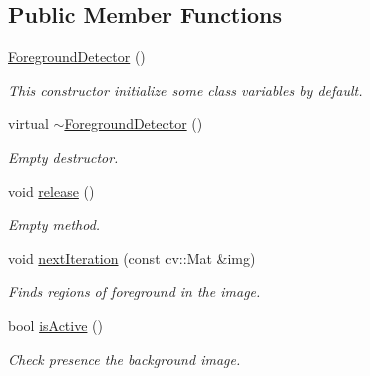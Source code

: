 \subsection*{Public Member Functions}
\begin{DoxyCompactItemize}
\item 
\hyperlink{classtld_1_1ForegroundDetector_afb086f8195e7358d8afb7c24194fc131}{Foreground\-Detector} ()
\begin{DoxyCompactList}\small\item\em This constructor initialize some class variables by default. \end{DoxyCompactList}\item 
virtual \hyperlink{classtld_1_1ForegroundDetector_ade0fb08c42a39ce8a2482b2bacea8c02}{$\sim$\-Foreground\-Detector} ()
\begin{DoxyCompactList}\small\item\em Empty destructor. \end{DoxyCompactList}\item 
void \hyperlink{classtld_1_1ForegroundDetector_a0bf609b2ba46774804a929253c225aac}{release} ()
\begin{DoxyCompactList}\small\item\em Empty method. \end{DoxyCompactList}\item 
void \hyperlink{classtld_1_1ForegroundDetector_a4f34509fa3a36529a39b911ed7693623}{next\-Iteration} (const cv\-::\-Mat \&img)
\begin{DoxyCompactList}\small\item\em Finds regions of foreground in the image. \end{DoxyCompactList}\item 
bool \hyperlink{classtld_1_1ForegroundDetector_abe107144cdd28271253a431cc6a22392}{is\-Active} ()
\begin{DoxyCompactList}\small\item\em Check presence the background image. \end{DoxyCompactList}\end{DoxyCompactItemize}

